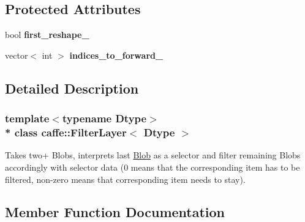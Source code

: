 \subsection*{Protected Attributes}
\begin{DoxyCompactItemize}
\item 
bool {\bfseries first\+\_\+reshape\+\_\+}\hypertarget{classcaffe_1_1FilterLayer_a0bfd8003e455c2f3a67172247058604b}{}\label{classcaffe_1_1FilterLayer_a0bfd8003e455c2f3a67172247058604b}

\item 
vector$<$ int $>$ {\bfseries indices\+\_\+to\+\_\+forward\+\_\+}\hypertarget{classcaffe_1_1FilterLayer_a3a53a99be807ac5e50de8fe7e6825c59}{}\label{classcaffe_1_1FilterLayer_a3a53a99be807ac5e50de8fe7e6825c59}

\end{DoxyCompactItemize}


\subsection{Detailed Description}
\subsubsection*{template$<$typename Dtype$>$\\*
class caffe\+::\+Filter\+Layer$<$ Dtype $>$}

Takes two+ Blobs, interprets last \hyperlink{classcaffe_1_1Blob}{Blob} as a selector and filter remaining Blobs accordingly with selector data (0 means that the corresponding item has to be filtered, non-\/zero means that corresponding item needs to stay). 

\subsection{Member Function Documentation}
